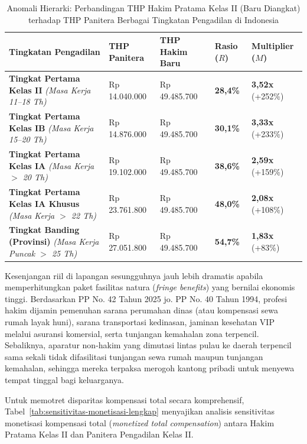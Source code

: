 \documentclass[12pt, a4paper]{article}
\begin{document}
\begin{table}[H]
\centering
\fontsize{9}{11}\selectfont
\caption{Anomali Hierarki: Perbandingan THP Hakim Pratama Kelas II (Baru Diangkat) terhadap THP Panitera Berbagai Tingkatan Pengadilan di Indonesia}
\label{tab:anomali-hierarki-lengkap}
\renewcommand{\arraystretch}{1.35}
\begin{tabular}{p{4.5cm} p{2.7cm} p{2.7cm} p{1.8cm} p{2.1cm}}
\hline
\textbf{Tingkatan Pengadilan} & \textbf{THP Panitera} & \textbf{THP Hakim Baru} & \textbf{Rasio ($R$)} & \textbf{Multiplier ($M$)} \tabularnewline
\hline
\raggedright\textbf{Tingkat Pertama Kelas II} \newline \textit{(Masa Kerja 11--18 Th)} & Rp 14.040.000 & Rp 49.485.700 & \textbf{28,4\%} & \textbf{3,52x} (+252\%) \tabularnewline
\raggedright\textbf{Tingkat Pertama Kelas IB} \newline \textit{(Masa Kerja 15--20 Th)} & Rp 14.876.000 & Rp 49.485.700 & \textbf{30,1\%} & \textbf{3,33x} (+233\%) \tabularnewline
\raggedright\textbf{Tingkat Pertama Kelas IA} \newline \textit{(Masa Kerja $>$ 20 Th)} & Rp 19.102.000 & Rp 49.485.700 & \textbf{38,6\%} & \textbf{2,59x} (+159\%) \tabularnewline
\raggedright\textbf{Tingkat Pertama Kelas IA Khusus} \newline \textit{(Masa Kerja $>$ 22 Th)} & Rp 23.761.800 & Rp 49.485.700 & \textbf{48,0\%} & \textbf{2,08x} (+108\%) \tabularnewline
\raggedright\textbf{Tingkat Banding (Provinsi)} \newline \textit{(Masa Kerja Puncak $>$ 25 Th)} & Rp 27.051.800 & Rp 49.485.700 & \textbf{54,7\%} & \textbf{1,83x} (+83\%) \tabularnewline
\hline
\end{tabular}
\end{table}

Kesenjangan riil di lapangan sesungguhnya jauh lebih dramatis apabila memperhitungkan paket fasilitas natura (\textit{fringe benefits}) yang bernilai ekonomis tinggi. Berdasarkan PP No. 42 Tahun 2025 jo. PP No. 40 Tahun 1994, profesi hakim dijamin pemenuhan sarana perumahan dinas (atau kompensasi sewa rumah layak huni), sarana transportasi kedinasan, jaminan kesehatan VIP melalui asuransi komersial, serta tunjangan kemahalan zona terpencil. Sebaliknya, aparatur non-hakim yang dimutasi lintas pulau ke daerah terpencil sama sekali tidak difasilitasi tunjangan sewa rumah maupun tunjangan kemahalan, sehingga mereka terpaksa merogoh kantong pribadi untuk menyewa tempat tinggal bagi keluarganya. 

Untuk memotret disparitas kompensasi total secara komprehensif, Tabel~\ref{tab:sensitivitas-monetisasi-lengkap} menyajikan analisis sensitivitas monetisasi kompensasi total (\textit{monetized total compensation}) antara Hakim Pratama Kelas II dan Panitera Pengadilan Kelas II.
\end{document}
